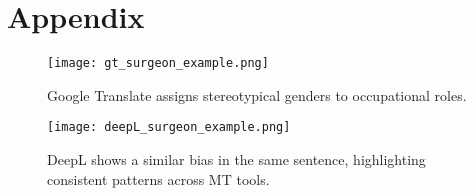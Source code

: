 \chapter*{Appendix}

\begin{figure}
	\centering
		\texttt{[image: gt\_surgeon\_example.png]}
	\caption{Google Translate assigns stereotypical genders to occupational roles.}
	\label{fig:gt_surgeon_example}
\end{figure}

\begin{figure}
	\centering
		\texttt{[image: deepL\_surgeon\_example.png]}
	\caption{DeepL shows a similar bias in the same sentence, highlighting consistent patterns across MT tools.}
	\label{fig:deepL_surgeon_example}
\end{figure}